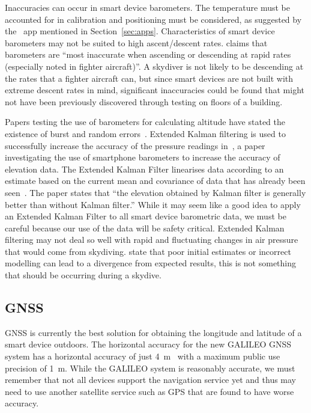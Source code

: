 \documentclass[11pt, twocolumn]{article}
\begin{document}
Inaccuracies can occur in smart device barometers. The temperature must be accounted for in calibration and positioning must be considered, as suggested by the~ app mentioned in Section~\ref{sec:apps}. Characteristics of smart device barometers may not be suited to high ascent/descent rates. \textcite{gray_integrated_1995} claims that barometers are ``most inaccurate when ascending or descending at rapid rates (especially noted in fighter aircraft)''. A skydiver is not likely to be descending at the rates that a fighter aircraft can, but since smart devices are not built with extreme descent rates in mind, significant inaccuracies could be found that might not have been previously discovered through testing on floors of a building.

Papers testing the use of barometers for calculating altitude have stated the existence of burst and random errors~\cite{gray_integrated_1995, liu_beyond_2014}. Extended Kalman filtering is used to successfully increase the accuracy of the pressure readings in~\textcite{liu_beyond_2014}, a paper investigating the use of smartphone barometers to increase the accuracy of elevation data. The Extended Kalman Filter linearises data according to an estimate based on the current mean and covariance of data that has already been seen~\cite{julier_unscented_2004}. The paper states that ``the elevation obtained by Kalman filter is generally better than without Kalman filter.'' While it may seem like a good idea to apply an Extended Kalman Filter to all smart device barometric data, we must be careful because our use of the data will be safety critical. Extended Kalman filtering may not deal so well with rapid and fluctuating changes in air pressure that would come from skydiving. \textcite{huang_analysis_2008} state that poor initial estimates or incorrect modelling can lead to a divergence from expected results, this is not something that should be occurring during a skydive.

\subsection{GNSS}\label{sec:gps} %

GNSS is currently the best solution for obtaining the longitude and latitude of a smart device outdoors. The horizontal accuracy for the new GALILEO GNSS system has a horizontal accuracy of just \SI{4}{\metre}~\cite{kaplan_understanding_2005} with a maximum public use precision of \SI{1}{\metre}. While the GALILEO system is reasonably accurate, we must remember that not all devices support the navigation service yet and thus may need to use another satellite service such as GPS that are found to have worse accuracy.
\end{document}
